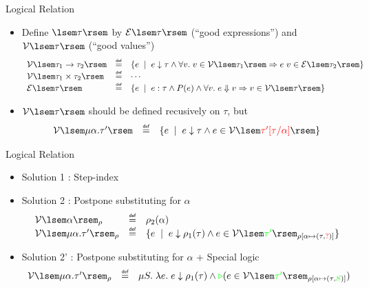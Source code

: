 \documentclass{beamer}
\newcommand\defeq{\mathrel{\overset{\makebox[0pt]{\mbox{\normalfont\tiny\sffamily def}}}{=}}}
\begin{document}
\begin{frame}{Logical Relation}

\begin{itemize}
\item Define $\lsem\tau\rsem$ by $\mathcal{E}\lsem\tau\rsem$ (``good expressions'') and $\mathcal{V}\lsem\tau\rsem$ (``good values'')
  $$
  \begin{array}{lcl}
    \mathcal{V}\lsem\tau_1\to\tau_2\rsem &\defeq& \{e \;\mid\; e \downarrow \tau \wedge \forall v.\;v \in \mathcal{V}\lsem\tau_1\rsem \Rightarrow e\;v\in \mathcal{E}\lsem\tau_2\rsem \} \\
    \mathcal{V}\lsem\tau_1\times\tau_2\rsem &\defeq& \cdots \\
    \mathcal{E}\lsem\tau\rsem &\defeq& \{e \;\mid\; e : \tau \wedge P(e) \wedge \forall v.\;e \Downarrow v \Rightarrow v \in \mathcal{V}\lsem\tau\rsem \}
  \end{array}
  $$
\item $\mathcal{V}\lsem\tau\rsem$ should be defined recusively on $\tau$, but
  $$
  \begin{array}{lcl}
    \mathcal{V}\lsem\mu\alpha.\tau'\rsem &\defeq& \{e \;\mid\; e \downarrow \tau \wedge e \in \mathcal{V}\lsem\textcolor{red}{\tau'[\tau/\alpha]}\rsem \}
  \end{array}
  $$
\end{itemize}

\end{frame}

\begin{frame}{Logical Relation}

\begin{itemize}
\item Solution 1 : Step-index
\item Solution 2 : Postpone substituting for $\alpha$
  $$
  \begin{array}{lcl}
    \mathcal{V}\lsem\alpha\rsem_\rho &\defeq& \rho_2(\alpha) \\
    \mathcal{V}\lsem\mu\alpha.\tau'\rsem_\rho &\defeq& \{e \;\mid\; e \downarrow \rho_1(\tau) \wedge e \in \mathcal{V}\lsem\textcolor{green}{\tau'}\rsem_{\rho[\alpha\mapsto(\tau,\textcolor{red}{?})]} \}
  \end{array}
  $$
\item Solution 2' : Postpone substituting for $\alpha$ + Special logic
  $$
  \begin{array}{lcl}
    \mathcal{V}\lsem\mu\alpha.\tau'\rsem_\rho &\defeq& \mu S.\;\lambda e.\; e \downarrow \rho_1(\tau) \wedge \textcolor{green}{\triangleright} (e \in \mathcal{V}\lsem\textcolor{green}{\tau'}\rsem_{\rho[\alpha\mapsto(\tau,\textcolor{green}{S})]})
  \end{array}
  $$
\end{itemize}

\end{frame}
\end{document}
